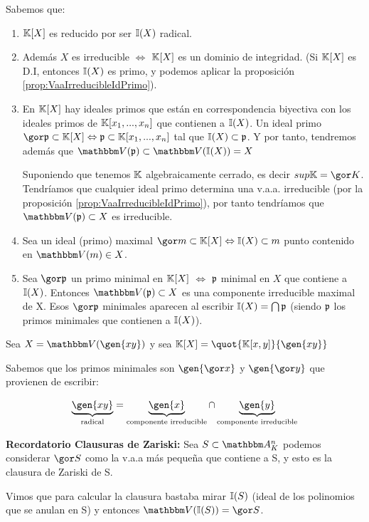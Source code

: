 Sabemos que:
\begin{enumerate}
	\item $\mathbb{K}[X]$ es reducido por ser $\mathbb{I}(X)$ radical.
	\item Además $X$ es irreducible $\Leftrightarrow$ $\mathbb{K}[X]$ es un dominio de integridad. (Si $\mathbb{K}[X]$ es D.I, entonces $\mathbb{I}(X)$ es primo, y podemos aplicar la proposición \ref{prop:VaaIrreducibleIdPrimo}).
	\item En $\mathbb{K}[X]$ hay ideales primos que están en correspondencia biyectiva con los ideales primos de $\mathbb{K}[x_1,...,x_n]$ que contienen a $\mathbb{I}(X)$. Un ideal primo $\cls{\pideal} \subset \K[X] \Leftrightarrow \pideal \subset \K[x_1,...,x_n]$ tal que $\mathbb{I}(X) \subset \mathfrak{p}$. Y por tanto, tendremos además que  $\V(\pideal) \subset \V(\I(X))=X$

	Suponiendo que tenemos $\mathbb{K}$ algebraicamente cerrado, es decir $sup \K= \cls{K}$. Tendríamos que cualquier ideal primo determina una v.a.a. irreducible (por la proposición \ref{prop:VaaIrreducibleIdPrimo}), por tanto tendríamos que $\V(\pideal)\subset X$ es irreducible.
	\item Sea un ideal (primo) maximal $\cls{m}  \subset \K[X] \Leftrightarrow \I(X) \subset m$ punto contenido en $\V(m) \in X$.
	\item Sea $\cls{\pideal}$ un primo minimal en $\mathbb{K}[X]$ $\Leftrightarrow$ $\mathfrak{p}$ minimal en $X$ que contiene a $\mathbb{I}(X)$. Entonces $\V(\pideal) \subset X$ es una componente irreducible maximal de X. Esos $\cls{\pideal}$ minimales aparecen al escribir $\mathbb{I}(X)= \bigcap \mathfrak{p}$ (siendo $\mathfrak{p}$ los primos minimales que contienen a $\mathbb{I}(X)$).
\end{enumerate}

\begin{example}
	Sea $X=\V(\gen{xy})$ y sea $\K[X]=\quot{\K[x,y]}{\gen{xy}}$

	Sabemos que los primos minimales son $\gen{\cls{x}}$ y $\gen{\cls{y}}$ que provienen de escribir:

	$$ \underbrace{\gen{xy}}_{\text{radical}} = \underbrace{\gen{x}}_{\text{componente irreducible}} \cap \underbrace{\gen{y}}_{\text{componente irreducible}}$$
\end{example}

\textbf{Recordatorio Clausuras de Zariski:} Sea $S \subset \Akn$ podemos considerar $\cls{S}$ como la v.a.a más pequeña que contiene a S, y esto es la clausura de Zariski de S.

Vimos que para calcular la clausura bastaba mirar $\mathbb{I}(S)$  (ideal de los polinomios que se anulan en S) y entonces $\V(\I(S))=\cls{S}$.

